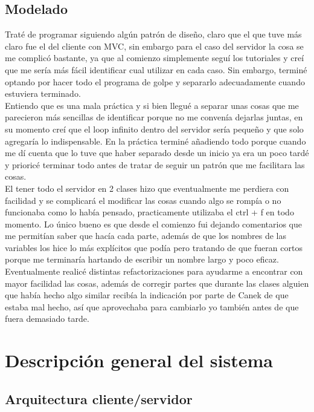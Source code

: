 \documentclass[12pt,a4paper]{article}
\begin{document}
\subsection{Modelado}
Traté de programar siguiendo algún patrón de diseño, claro que el que tuve más claro fue el del cliente con MVC, sin embargo para el caso 
del servidor la cosa se me complicó bastante, ya que al comienzo simplemente seguí los tutoriales y creí que me sería más fácil identificar 
cual utilizar en cada caso. Sin embargo, terminé optando por hacer todo el programa de golpe y separarlo adecuadamente cuando estuviera 
terminado. \\
Entiendo que es una mala práctica y si bien llegué a separar unas cosas que me parecieron más sencillas de identificar porque no me convenía 
dejarlas juntas, en su momento creí que el loop infinito dentro del servidor sería pequeño y que solo agregaría lo indispensable. En la 
práctica terminé añadiendo todo porque cuando me dí cuenta que lo tuve que haber separado desde un inicio ya era un poco tardé y prioricé 
terminar todo antes de tratar de seguir un patrón que me facilitara las cosas.
\\
El tener todo el servidor en 2 clases hizo que eventualmente me perdiera con facilidad y se complicará el modificar las cosas cuando algo se 
rompía o no funcionaba como lo había pensado, practicamente utilizaba el ctrl + f en todo momento. Lo único bueno es que desde el comienzo 
fui dejando comentarios que me permitían saber que hacía cada parte, además de que los nombres de las variables los hice lo más explícitos 
que podía pero tratando de que fueran cortos porque me terminaría hartando de escribir un nombre largo y poco eficaz.
\\
Eventualmente realicé distintas refactorizaciones para ayudarme a encontrar con mayor facilidad las cosas, además de corregir partes que 
durante las clases alguien que había hecho algo similar recibía la indicación por parte de Canek de que estaba mal hecho, así que 
aprovechaba para cambiarlo yo también antes de que fuera demasiado tarde.\\
\section{Descripción general del sistema}

\subsection{Arquitectura cliente/servidor}
\end{document}
